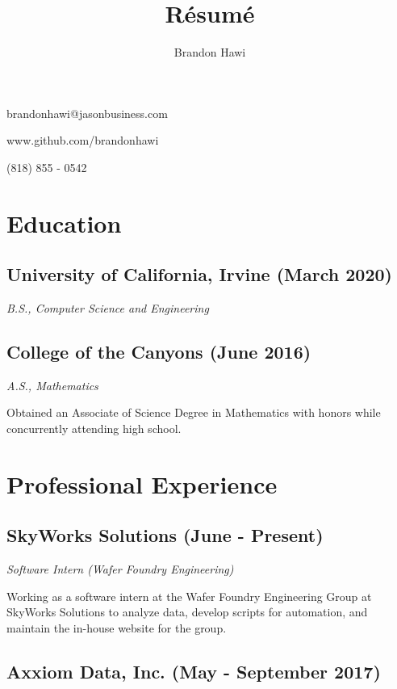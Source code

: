 \documentclass{article}
\makeatletter
\renewcommand{\maketitle}
{
\begin{flushleft}
\huge
\textbf{\theauthor}
\small

brandonhawi@jasonbusiness.com

www.github.com/brandonhawi

(818) 855 - 0542
\end{flushleft}
}
\makeatother
\begin{document}
\title{R\'esum\'e}
\author{Brandon Hawi}

\maketitle
\vspace{-0.1in}
\section{Education}

\subsection{University of California, Irvine (March 2020)}
\noindent\textit{B.S., Computer Science and Engineering}

\subsection{College of the Canyons (June 2016)}
\noindent\textit{A.S., Mathematics}

Obtained an Associate of Science Degree in Mathematics with honors while concurrently attending
high school.

\section{Professional Experience}

%
%
%

\subsection{SkyWorks Solutions (June - Present)}

\noindent\textit{Software Intern (Wafer Foundry Engineering)}

Working as a software intern at the Wafer Foundry Engineering Group at SkyWorks Solutions to 
analyze data, develop scripts for automation, and maintain the in-house website for the group.

\subsection{Axxiom Data, Inc. (May - September 2017)}
\end{document}
